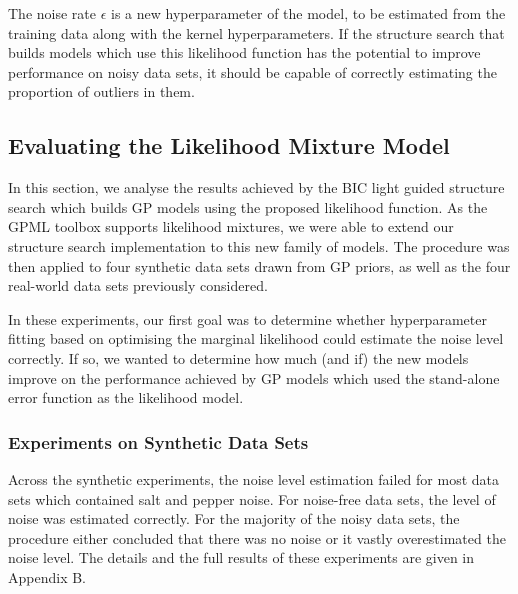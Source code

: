 \documentclass[a4paper,12pt ]{report}
\begin{document}
The noise rate $\epsilon$ is a new hyperparameter of the model, to be estimated from the training data along with the kernel hyperparameters. If the structure search that builds models which use this likelihood function has the potential to improve performance on noisy data sets, it should be capable of correctly estimating the proportion of outliers in them.





\subsection{Evaluating the Likelihood Mixture Model}



In this section, we analyse the results achieved by the BIC light guided structure search which builds GP models using the proposed likelihood function. As the GPML toolbox supports likelihood mixtures, we were able to extend our structure search implementation to this new family of models. The procedure was then applied to four synthetic data sets drawn from GP priors, as well as the four real-world data sets previously considered.


In these experiments, our first goal was to determine whether hyperparameter fitting based on optimising the marginal likelihood could estimate the noise level correctly. If so, we wanted to determine how much (and if) the new models improve on the performance achieved by GP models which used the stand-alone error function as the likelihood model.

\subsubsection*{Experiments on Synthetic Data Sets}

Across the synthetic experiments, the noise level estimation failed for most data sets which contained salt and pepper noise. For noise-free data sets, the level of noise was estimated correctly. For the majority of the noisy data sets, the procedure either concluded that there was no noise or it vastly overestimated the noise level. The details and the full results of these experiments are given in Appendix B.
\end{document}
